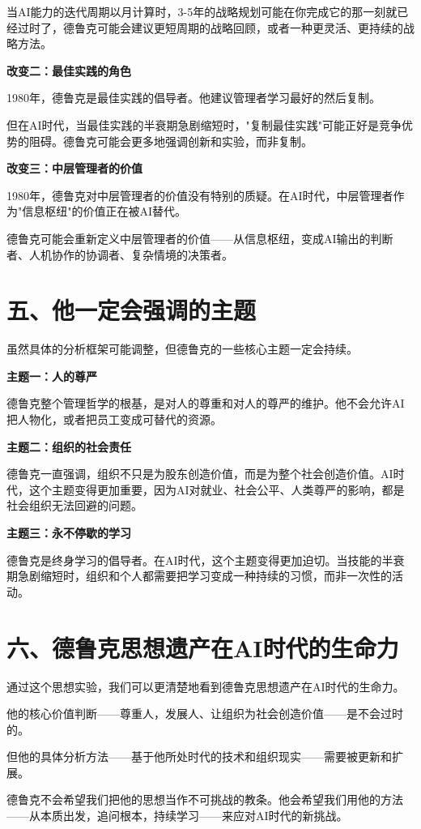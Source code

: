 当AI能力的迭代周期以月计算时，3-5年的战略规划可能在你完成它的那一刻就已经过时了，德鲁克可能会建议更短周期的战略回顾，或者一种更灵活、更持续的战略方法。

\textbf{改变二：最佳实践的角色}

1980年，德鲁克是最佳实践的倡导者。他建议管理者学习最好的然后复制。

但在AI时代，当最佳实践的半衰期急剧缩短时，"复制最佳实践"可能正好是竞争优势的阻碍。德鲁克可能会更多地强调创新和实验，而非复制。

\textbf{改变三：中层管理者的价值}

1980年，德鲁克对中层管理者的价值没有特别的质疑。在AI时代，中层管理者作为"信息枢纽"的价值正在被AI替代。

德鲁克可能会重新定义中层管理者的价值——从信息枢纽，变成AI输出的判断者、人机协作的协调者、复杂情境的决策者。

\section{五、他一定会强调的主题}


虽然具体的分析框架可能调整，但德鲁克的一些核心主题一定会持续。

\textbf{主题一：人的尊严}

德鲁克整个管理哲学的根基，是对人的尊重和对人的尊严的维护。他不会允许AI把人物化，或者把员工变成可替代的资源。

\textbf{主题二：组织的社会责任}

德鲁克一直强调，组织不只是为股东创造价值，而是为整个社会创造价值。AI时代，这个主题变得更加重要，因为AI对就业、社会公平、人类尊严的影响，都是社会组织无法回避的问题。

\textbf{主题三：永不停歇的学习}

德鲁克是终身学习的倡导者。在AI时代，这个主题变得更加迫切。当技能的半衰期急剧缩短时，组织和个人都需要把学习变成一种持续的习惯，而非一次性的活动。

\section{六、德鲁克思想遗产在AI时代的生命力}


通过这个思想实验，我们可以更清楚地看到德鲁克思想遗产在AI时代的生命力。

他的核心价值判断——尊重人，发展人、让组织为社会创造价值——是不会过时的。

但他的具体分析方法——基于他所处时代的技术和组织现实——需要被更新和扩展。

德鲁克不会希望我们把他的思想当作不可挑战的教条。他会希望我们用他的方法——从本质出发，追问根本，持续学习——来应对AI时代的新挑战。


